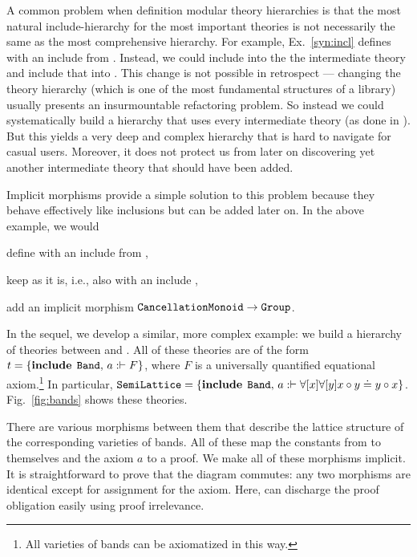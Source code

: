 A common problem when definition modular theory hierarchies is that the most natural include-hierarchy for the most important theories is not necessarily the same as the most comprehensive hierarchy.
For example, Ex.~\ref{syn:incl} defines  with an include from .
Instead, we could include  into the the intermediate theory  and include that into .
This change is not possible in retrospect --- changing the theory hierarchy (which is one of the most fundamental structures of a library) usually presents an insurmountable refactoring problem.
So instead we could systematically build a hierarchy that uses every intermediate theory (as done in \cite{mathscheme}).
But this yields a very deep and complex hierarchy that is hard to navigate for casual users.
Moreover, it does not protect us from later on discovering yet another intermediate theory that should have been added.

Implicit morphisms provide a simple solution to this problem because they behave effectively like inclusions but can be added later on.
In the above example, we would
\begin{compactitem}
 \item define  with an include from ,
 \item keep  as it is, i.e., also with an include ,
 \item add an implicit morphism $\operatorname{\mathtt{CancellationMonoid}}\to\operatorname{\mathtt{Group}}$.
\end{compactitem}

In the sequel, we develop a similar, more complex example: we build a hierarchy of theories between  and .
All of these theories are of the form $t=\{\operatorname{\mathbf{include}}{\;\operatorname{\mathtt{Band}}},\,a:\vdash F\}$, where $F$ is a universally quantified equational axiom.\footnote{All varieties of bands can be axiomatized in this way.}
In particular, $\operatorname{\mathtt{SemiLattice}}=\{\operatorname{\mathbf{include}}{\;\operatorname{\mathtt{Band}}},\,a:\vdash \forall [x]\forall [y] x\circ y\doteq y\circ x\}$.
Fig.~\ref{fig:bands} shows these theories.

There are various morphisms between them that describe the lattice structure of the corresponding varieties of bands.
All of these map the constants from  to themselves and the axiom $a$ to a proof.
We make all of these morphisms implicit.
It is straightforward to prove that the diagram commutes: any two morphisms are identical except for assignment for the axiom.
Here, \mmt can discharge the proof obligation easily using proof irrelevance.

